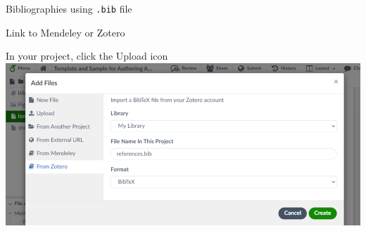\documentclass[13pt]{beamer}
\newcommand{\itemA}{\item[\textcolor{black}{\textbullet}]}
\newcommand{\green}{\textcolor{colorgreen}}
\begin{document}
\begin{frame}{Bibliographies using \texttt{.bib} file}

 \begin{fullpageitemize}
        
    \itemA Link to Mendeley or Zotero \hfill \break
        \begin{fullpageitemize}
        \item [\textcolor{black}{\textopenbullet}] In your project, click the \green{Upload} icon \\ \hfill \break
        \includegraphics[width=\textwidth,keepaspectratio]{images/ut_overleaf5.png}
        \end{fullpageitemize}
\end{fullpageitemize}

\end{frame}
\end{document}
